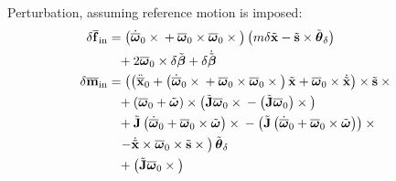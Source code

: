 \documentclass[10pt,dvips,fleqn,subeqn]{report}
\newcommand{\T}[1]{\bm{\mathbf{#1}}}
\newcommand{\TT}[1]{\bm{\mathbf{#1}}}
\begin{document}
Perturbation, assuming reference motion is imposed:
\begin{subequations}
\begin{align}
	\delta\overline{\T{f}}_{\text{in}}
	&= \plbr{
		\dot{\overline{\T{\omega}}}_0 \times{}
		+ \overline{\T{\omega}}_0 \times \overline{\T{\omega}}_0 \times{}
	} \plbr{
		m \delta\tilde{\T{x}}
		- \tilde{\T{s}} \times \tilde{\T{\theta}}_{\delta}
	}
	\noindent \\
	&\hphantom{=}+ 2 \overline{\T{\omega}}_0 \times \delta\tilde{\T{\beta}}
	+ \delta \dot{\tilde{\T{\beta}}} \\
%
	\delta\overline{\T{m}}_{\text{in}}
	&= \lplbr{
		\plbr{
			\ddot{\overline{\T{x}}}_0
			+ \plbr{
				\dot{\overline{\T{\omega}}}_0 \times{}
				+ \overline{\T{\omega}}_0 \times \overline{\T{\omega}}_0 \times{}
			} \tilde{\T{x}}
			+ \overline{\T{\omega}}_0 \times \dot{\tilde{\T{x}}}
		} \times \tilde{\T{s}} \times{}
	} \nonumber \\
	&\hphantom{=}
		+ \plbr{
			\overline{\T{\omega}}_0
			+ \tilde{\T{\omega}}
		} \times \plbr{
			\tilde{\TT{J}} \overline{\T{\omega}}_0 \times{}
			- \plbr{\tilde{\TT{J}} \overline{\T{\omega}}_0} \times{}
		}
	\nonumber \\
	&\hphantom{=}
		+ \tilde{\TT{J}} \plbr{
			\dot{\overline{\T{\omega}}}_0
			+ \overline{\T{\omega}}_0 \times \tilde{\T{\omega}}
		} \times{}
		- \plbr{\tilde{\TT{J}} \plbr{
			\dot{\overline{\T{\omega}}}_0
			+ \overline{\T{\omega}}_0 \times \tilde{\T{\omega}}
		}} \times{}
	\nonumber \\
	&\hphantom{=}
	\rplbr{
		- \dot{\tilde{\T{x}}} \times \overline{\T{\omega}}_0 \times \tilde{\T{s}} \times{}
	} \tilde{\T{\theta}}_{\delta}
	\nonumber \\
	&\hphantom{=}
	+ \plbr{
		\tilde{\TT{J}} \overline{\T{\omega}}_0 \times{}
}
\end{align}
\end{subequations}
\end{document}

